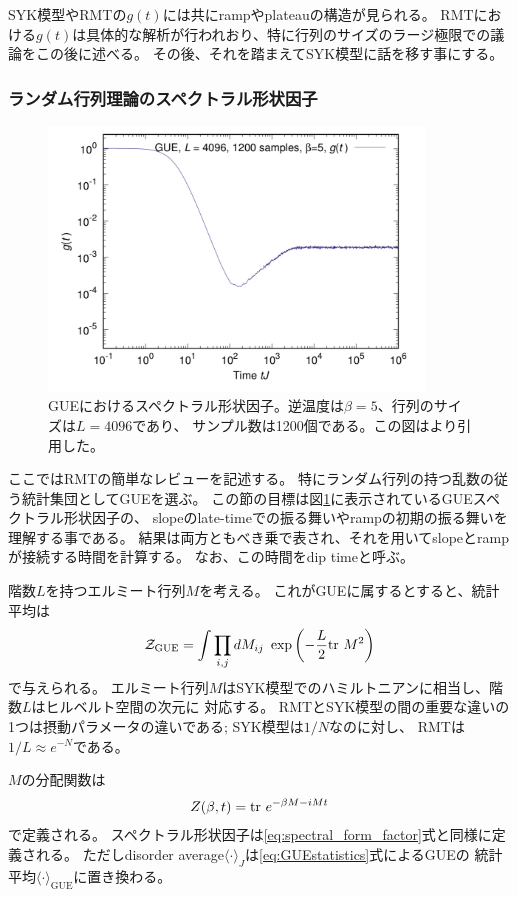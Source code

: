SYK模型やRMTの$g(t)$には共にrampやplateauの構造が見られる。
RMTにおける$g(t)$は具体的な解析が行われおり、特に行列のサイズのラージ極限での議論をこの後に述べる。
その後、それを踏まえてSYK模型に話を移す事にする。

\subsubsection{ランダム行列理論のスペクトラル形状因子}
\begin{figure}[ht]
	\centering
	\includegraphics[width=10cm]{figures/spectralformfactor_inRMT}
	\caption{GUEにおけるスペクトラル形状因子。逆温度は$\beta=5$、行列のサイズは$L=4096$であり、
		サンプル数は1200個である。この図は\cite{polchinski_chaos}より引用した。
	}
	\label{fig:spectralformfactor_inRMT}
\end{figure}
ここではRMTの簡単なレビューを記述する。
特にランダム行列の持つ乱数の従う統計集団としてGUEを選ぶ。
この節の目標は図\ref{fig:spectralformfactor_inRMT}に表示されているGUEスペクトラル形状因子の、
slopeのlate-timeでの振る舞いやrampの初期の振る舞いを理解する事である。
結果は両方ともべき乗で表され、それを用いてslopeとrampが接続する時間を計算する。
なお、この時間をdip timeと呼ぶ。

階数$L$を持つエルミート行列$M$を考える。
これがGUEに属するとすると、統計平均は
\begin{align}
	\mathcal{Z}_{\mathrm{GUE}} = \int \prod_{i, j} dM_{ij}\ \exp\left(
		-\frac{L}{2}\mathrm{tr}\ M^2
	\right)
	\label{eq:GUEstatistics}
\end{align}
で与えられる。
エルミート行列$M$はSYK模型でのハミルトニアンに相当し、階数$L$はヒルベルト空間の次元に
対応する。
RMTとSYK模型の間の重要な違いの1つは摂動パラメータの違いである; SYK模型は$1/N$なのに対し、
RMTは$1/L \approx e^{-N}$である。

$M$の分配関数は
\begin{align}
	Z(\beta, t) = \mathrm{tr}\ e^{-\beta M - iMt}
	\label{eq:GUEpartition_function}
\end{align}
で定義される。
スペクトラル形状因子は\eqref{eq:spectral_form_factor}式と同様に定義される。
ただしdisorder average$\langle \cdot\rangle_J$は\eqref{eq:GUEstatistics}式によるGUEの
統計平均$\langle\cdot\rangle_{\mathrm{GUE}}$に置き換わる。

